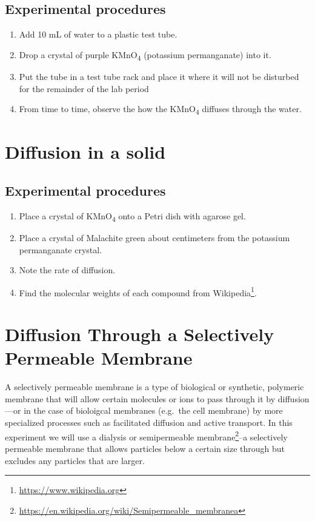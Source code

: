 \documentclass[]{book}
\providecommand{\tightlist}{%
  \setlength{\itemsep}{0pt}\setlength{\parskip}{0pt}}
\let\rmarkdownfootnote\footnote%
\def\footnote{\protect\rmarkdownfootnote}
\renewcommand{\href}[2]{#2\footnote{\url{#1}}}
\theoremstyle{definition}
\theoremstyle{definition}
\theoremstyle{definition}
\theoremstyle{remark}
\begin{document}
\subsection{Experimental procedures}\label{experimental-procedures-14}

\begin{enumerate}
\def\labelenumi{\arabic{enumi}.}
\tightlist
\item
  Add 10 mL of water to a plastic test tube.
\item
  Drop a crystal of purple KMnO\textsubscript{4} (potassium
  permanganate) into it.
\item
  Put the tube in a test tube rack and place it where it will not be
  disturbed for the remainder of the lab period
\item
  From time to time, observe the how the KMnO\textsubscript{4} diffuses
  through the water.
\end{enumerate}

\section{Diffusion in a solid}\label{diffusion-in-a-solid}

\subsection{Experimental procedures}\label{experimental-procedures-15}

\begin{enumerate}
\def\labelenumi{\arabic{enumi}.}
\tightlist
\item
  Place a crystal of KMnO\textsubscript{4} onto a Petri dish with
  agarose gel.
\item
  Place a crystal of Malachite green about centimeters from the
  potassium permanganate crystal.
\item
  Note the rate of diffusion.
\item
  Find the molecular weights of each compound from
  \href{https://www.wikipedia.org}{Wikipedia}.
\end{enumerate}

\section{Diffusion Through a Selectively Permeable
Membrane}\label{diffusion-through-a-selectively-permeable-membrane}

A selectively permeable membrane is a type of biological or synthetic,
polymeric membrane that will allow certain molecules or ions to pass
through it by diffusion---or in the case of bioloigcal membranes
(e.g.~the cell membrane) by more specialized processes such as
facilitated diffusion and active transport. In this experiment we will
use a dialysis or
\href{https://en.wikipedia.org/wiki/Semipermeable_membranea}{semipermeable
membrane}--a selectively permeable membrane that allows particles below
a certain size through but excludes any particles that are larger.
\end{document}
